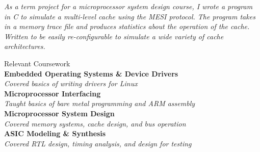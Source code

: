 \documentclass{article}
\newcommand\rightcolwidthvar{0.60}
\begin{document}
\begin{minipage}[t]{\rightcolwidthvar \textwidth}
\begin{flushleft}
\textsf{\textit{%
As a term project for a microprocessor system design course, I wrote a program in C to simulate a multi-level cache using the MESI protocol.  The program takes in a memory trace file and produces statistics about the operation of the cache.  Written to be easily re-configurable to simulate a wide variety of cache architectures.\\}}
\end{flushleft}
%
%
\begin{flushleft}
	\medskip
	\textsf{\Large Relevant Coursework}\\
	\medskip
	\textbf{Embedded Operating Systems \& Device Drivers\\}
	\textsf{\textit{Covered basics of writing drivers for Linux\\}}\vspace{2pt}
	\textbf{Microprocessor Interfacing\\}
	\textsf{\textit{Taught basics of bare metal programming and ARM assembly\\}}\vspace{2pt}
	\textbf{Microprocessor System Design\\}
	\textsf{\textit{Covered memory systems, cache design, and bus operation\\}}\vspace{2pt}
	\textbf{ASIC Modeling \& Synthesis\\}
	\textsf{\textit{Covered RTL design, timing analysis, and design for testing\\}}\vspace{2pt}
\end{flushleft}
\end{minipage}

\bigskip
\end{document}
